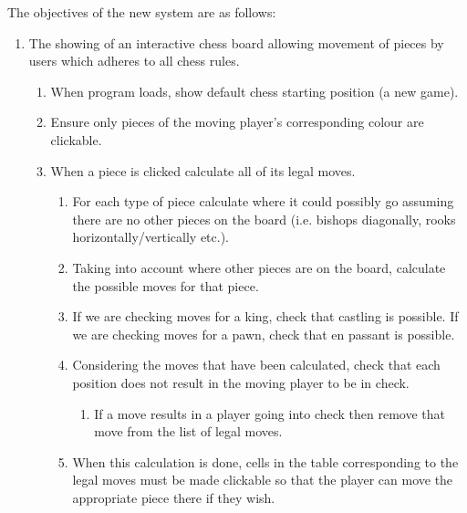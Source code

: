 The objectives of the new system are as follows:
\begin{enumerate}
	\item The showing of an interactive chess board allowing movement of pieces by users which adheres to all chess rules.
	\begin{enumerate}
		\item When program loads, show default chess starting position (a new game).
		\item Ensure only pieces of the moving player's corresponding colour are clickable.
		\item When a piece is clicked calculate all of its legal moves.
		\begin{enumerate}
			\item For each type of piece calculate where it could possibly go assuming there are no other pieces on the board (i.e. bishops diagonally, rooks horizontally/vertically etc.).
			\item Taking into account where other pieces are on the board, calculate the possible moves for that piece.
			\item If we are checking moves for a king, check that castling is possible. If we are checking moves for a pawn, check that en passant is possible.
			\item Considering the moves that have been calculated, check that each position does not result in the moving player to be in check. 
			\begin{enumerate}
				\item If a move results in a player going into check then remove that move from the list of legal moves.
			\end{enumerate}
			\item When this calculation is done, cells in the table corresponding to the legal moves must be made clickable so that the player can move the appropriate piece there if they wish.
			

\end{enumerate}
\end{enumerate}
\end{enumerate}
